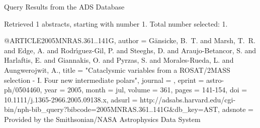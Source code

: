Query Results from the ADS Database


Retrieved 1 abstracts, starting with number 1.  Total number selected: 1.

@ARTICLE{2005MNRAS.361..141G,
   author = {{G{\"a}nsicke}, B.~T. and {Marsh}, T.~R. and {Edge}, A. and 
	{Rodr{\'{\i}}guez-Gil}, P. and {Steeghs}, D. and {Araujo-Betancor}, S. and 
	{Harlaftis}, E. and {Giannakis}, O. and {Pyrzas}, S. and {Morales-Rueda}, L. and 
	{Aungwerojwit}, A.},
    title = "{Cataclysmic variables from a ROSAT/2MASS selection - I. Four new intermediate polars}",
  journal = {\mnras},
   eprint = {astro-ph/0504460},
     year = 2005,
    month = jul,
   volume = 361,
    pages = {141-154},
      doi = {10.1111/j.1365-2966.2005.09138.x},
   adsurl = {http://adsabs.harvard.edu/cgi-bin/nph-bib_query?bibcode=2005MNRAS.361..141G&db_key=AST},
  adsnote = {Provided by the Smithsonian/NASA Astrophysics Data System}
}


